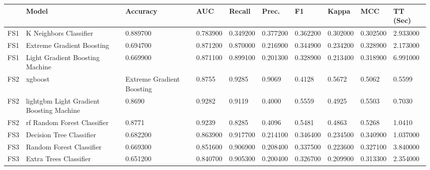 ﻿\begin{table}[!ht]
    \centering
    \begin{tabular}{|l|l|l|l|l|l|l|l|l|l|}
    \hline
        ~ & Model & Accuracy & AUC & Recall & Prec. & F1 & Kappa & MCC & TT (Sec) \\ \hline
        FS1 & K Neighbors Classifier & 0.889700 & 0.783900 & 0.349200 & 0.377200 & 0.362200 & 0.302000 & 0.302500 & 2.933000 \\ \hline
        FS1 & Extreme Gradient Boosting & 0.694700 & 0.871200 & 0.870000 & 0.216900 & 0.344900 & 0.234200 & 0.328900 & 2.173000 \\ \hline
        FS1 & Light Gradient Boosting Machine & 0.669900 & 0.871100 & 0.899100 & 0.201300 & 0.328900 & 0.213400 & 0.318900 & 6.991000 \\ \hline
        FS2 & xgboost & Extreme Gradient Boosting & 0.8755 & 0.9285 & 0.9069 & 0.4128 & 0.5672 & 0.5062 & 0.5599 \\ \hline
        FS2 & lightgbm	Light Gradient Boosting Machine & 0.8690 & 0.9282 & 0.9119 & 0.4000 & 0.5559 & 0.4925 & 0.5503 & 0.7030 \\ \hline
        FS2 & rf	Random Forest Classifier & 0.8771 & 0.9239 & 0.8285 & 0.4096 & 0.5481 & 0.4863 & 0.5268 & 1.0410 \\ \hline
        FS3 & Decision Tree Classifier & 0.682200 & 0.863900 & 0.917700 & 0.214100 & 0.346400 & 0.234500 & 0.340900 & 1.037000 \\ \hline
        FS3 & Random Forest Classifier & 0.669300 & 0.851600 & 0.906900 & 0.208400 & 0.337500 & 0.223600 & 0.327100 & 3.840000 \\ \hline
        FS3 & Extra Trees Classifier & 0.651200 & 0.840700 & 0.905300 & 0.200400 & 0.326700 & 0.209900 & 0.313300 & 2.354000 \\ \hline
    \end{tabular}
\end{table}